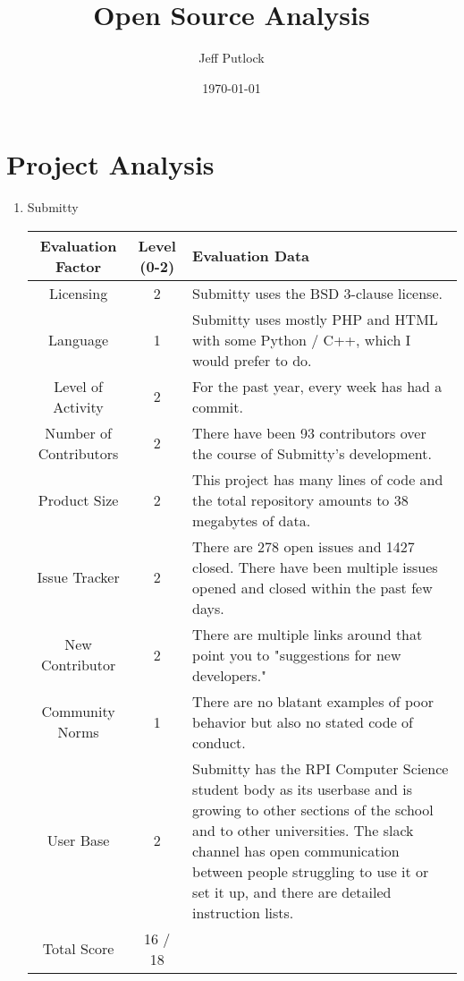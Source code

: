 \documentclass[12pt]{article}
\author{Jeff Putlock}
\date{\today}
\title{\vspace*{-3cm}Open Source Analysis}
\begin{document}
	
	\maketitle
	
	\section{Project Analysis}
	
	\begin{enumerate}
		\item Submitty
		
		\hspace*{-1cm}
		\noindent\begin{tabular}{ | c | c | L | } 
			\hline
			Evaluation Factor & Level (0-2) & Evaluation Data \\\hline
			Licensing & 2 & Submitty uses the BSD 3-clause license. \\\hline
			Language & 1 & Submitty uses mostly PHP and HTML with some Python / C++, which I would prefer to do. \\\hline
			Level of Activity & 2 & For the past year, every week has had a commit. \\\hline		
			Number of Contributors & 2 & There have been 93 contributors over the course of Submitty's development. \\\hline
			Product Size & 2 & This project has many lines of code and the total repository amounts to 38 megabytes of data. \\\hline
			Issue Tracker & 2 & There are 278 open issues and 1427 closed. There have been multiple issues opened and closed within the past few days. \\\hline
			New Contributor & 2 & There are multiple links around that point you to "suggestions for new developers." \\\hline
			Community Norms & 1 & There are no blatant examples of poor behavior but also no stated code of conduct. \\\hline
			User Base & 2 & Submitty has the RPI Computer Science student body as its userbase and is growing to other sections of the school and to other universities. The slack channel has open communication between people struggling to use it or set it up, and there are detailed instruction lists. \\\hline
			Total Score & 16 / 18& \\\hline
		\end{tabular}
	
	\newpage
	

\end{enumerate}
\end{document}

